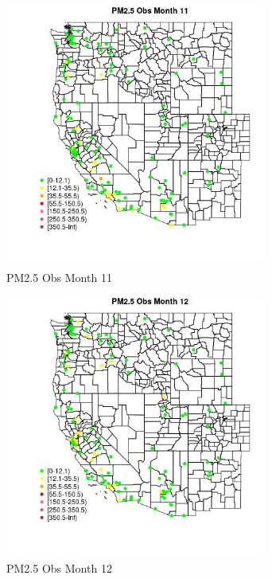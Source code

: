 \begin{figure} 
\centering  
\includegraphics[width=0.77\textwidth]{Code_Outputs/Report_ML_input_PM25_Step4_part_e_de_duplicated_aves_MapObsMo11PM25_Obs.jpg} 
\caption{\label{fig:Report_ML_input_PM25_Step4_part_e_de_duplicated_avesMapObsMo11PM25_Obs}PM2.5 Obs Month 11} 
\end{figure} 
 

\begin{figure} 
\centering  
\includegraphics[width=0.77\textwidth]{Code_Outputs/Report_ML_input_PM25_Step4_part_e_de_duplicated_aves_MapObsMo12PM25_Obs.jpg} 
\caption{\label{fig:Report_ML_input_PM25_Step4_part_e_de_duplicated_avesMapObsMo12PM25_Obs}PM2.5 Obs Month 12} 
\end{figure} 
 

